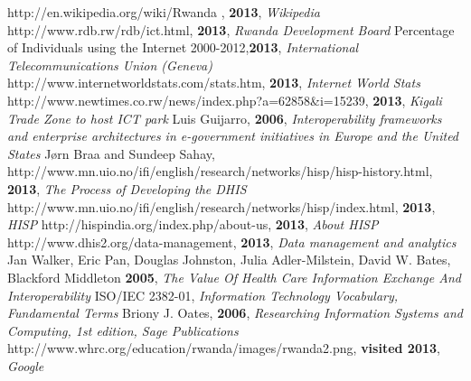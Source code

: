 \begin{thebibliography}{99}
http://en.wikipedia.org/wiki/Rwanda , {\bfseries 2013}, {\itshape Wikipedia}
http://www.rdb.rw/rdb/ict.html, {\bfseries 2013}, {\itshape Rwanda Development Board}
Percentage of Individuals using the Internet 2000-2012,{\bfseries 2013}, {\itshape International Telecommunications Union (Geneva)}
http://www.internetworldstats.com/stats.htm, {\bfseries 2013}, {\itshape Internet World Stats}
http://www.newtimes.co.rw/news/index.php?a=62858\&i=15239, {\bfseries 2013}, {\itshape Kigali Trade Zone to host ICT park}
Luis Guijarro, {\bfseries 2006}, {\itshape Interoperability frameworks and enterprise architectures in e-government initiatives in Europe and the United States}
Jørn Braa and Sundeep Sahay, http://www.mn.uio.no/ifi/english/research/networks/hisp/hisp-history.html, {\bfseries 2013}, {\itshape The Process of Developing the DHIS}
http://www.mn.uio.no/ifi/english/research/networks/hisp/index.html, {\bfseries 2013}, {\itshape HISP}
http://hispindia.org/index.php/about-us, {\bfseries 2013}, {\itshape About HISP}
http://www.dhis2.org/data-management, {\bfseries 2013}, {\itshape Data management and analytics}
Jan Walker, Eric Pan, Douglas Johnston, Julia Adler-Milstein, David W. Bates, Blackford Middleton {\bfseries 2005}, {\itshape The Value Of Health Care Information Exchange And Interoperability}
ISO/IEC 2382-01, {\itshape Information Technology Vocabulary, Fundamental Terms}
Briony J. Oates, {\bfseries 2006}, {\itshape Researching Information Systems and Computing, 1st edition, Sage Publications}
http://www.whrc.org/education/rwanda/images/rwanda2.png, {\bfseries visited 2013}, {\itshape Google}

\end{thebibliography}